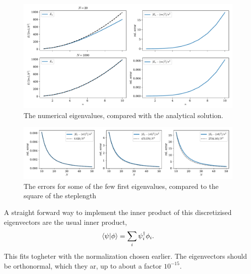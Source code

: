 \documentclass{article}
\begin{document}
    \begin{figure}[h]
        \vspace{-1cm}
        \centering
        \includegraphics[width=\textwidth]{particle_in_box/values}
        \caption{The numerical eigenvalues, compared with the analytical solution.}
        \label{fig:eigenvalues}
    \end{figure}

    \begin{figure}[h]
        \centering
        \includegraphics[width=\textwidth]{particle_in_box/error}
        \caption{The errors for some of the few first eigenvalues, compared to the square of the steplength}
        \label{fig:errors}
    \end{figure}

    A straight forward way to implement the inner product of this discretizised eigenvectors are the usual inner product, 
    \begin{equation*}
        \bra{\psi} \ket{\phi} = \sum_i \psi^\dagger_i \phi_i.
    \end{equation*}
    This fits togheter with the normalization chosen earlier. The eigenvectors should be orthonormal, which they ar, up to about a factor $10^{-15}$.
\end{document}
